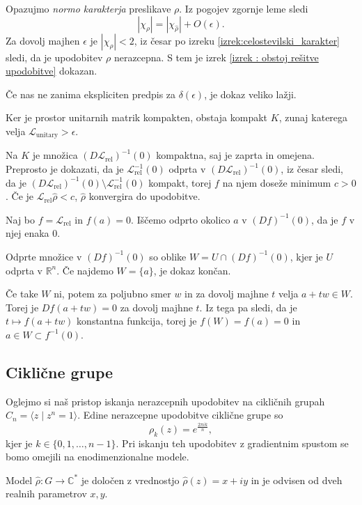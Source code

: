 \documentclass[mat2, tisk]{fmfdelo}
\newcommand{\R}{\mathbb R}
\newcommand{\Loss}[1]{\mathcal L _\text{#1}}
\newcommand{\C}{\mathbb C}
\begin{document}
\begin{dokaz}
  Opazujmo \emph{normo karakterja} preslikave $\rho$. Iz pogojev
  zgornje leme
  sledi
  $$
  |\chi_\rho| = |\chi_{\hat \rho}| + O(\epsilon).
  $$
  Za dovolj majhen $\epsilon$ je
  $|\chi_{ \rho}| < 2$, iz česar po izreku
  \ref{izrek:celostevilski_karakter} sledi, da je upodobitev
  $\rho$ nerazcepna. S tem je izrek
  \ref{izrek : obstoj rešitve upodobitve} dokazan.
\end{dokaz}
\begin{opomba}
  \label{dokaz_kazhdan_enostaven}
  Če nas ne zanima ekspliciten predpis za  $\delta(\epsilon)$,
  je dokaz veliko lažji.

  Ker je prostor unitarnih matrik kompakten, obstaja kompakt
  $K$, zunaj katerega velja
  $\Loss{unitary} > \epsilon$.

  Na $K$ je množica $(D\Loss{rel})^{-1} (0)$ kompaktna,
  saj je zaprta in omejena.
  Preprosto je dokazati, da je
  $ \Loss{rel}^{-1}(0)$ odprta v $(D\Loss{rel})^{-1} (0)$, iz česar sledi, da je
  $(D\Loss{rel})^{-1} (0) \setminus \Loss{rel}^{-1}(0)$ kompakt,
  torej $f$ na njem doseže
  minimum $c > 0$. Če je $\Loss{rel} \hat \rho < c$,
  $\hat \rho$ konvergira do upodobitve.

  Naj bo $f = \Loss{rel}$ in $f(a) = 0$. Iščemo odprto okolico $a$ v
  $(Df)^{-1}(0)$, da je $f$ v njej enaka 0.

  Odprte množice v $(Df)^{-1}(0)$ so oblike $W = U \cap (Df)^{-1}(0)$,
  kjer je $U$ odprta v $\R^n$. Če najdemo $W = \{a\}$, je dokaz končan.

  Če take $W$ ni, potem  za poljubno smer $w$ in  za dovolj majhne $t$ velja
  $a + tw  \in W$. Torej je $Df(a + tw) = 0$ za dovolj majhne $t$.
  Iz tega pa sledi, da je $t \mapsto f(a + tw)$ konstantna funkcija, torej je
  $f(W) = f(a) = 0$ in $a \in W \subset f^{-1}(0)$.
\end{opomba}
\subsection{Ciklične grupe}
\label{subsection:ciklicne-grupe}
Oglejmo si naš pristop iskanja nerazcepnih upodobitev na
cikličnih grupah $C_n = \langle z \mid z^n=1 \rangle$. Edine nerazcepne
upodobitve ciklične grupe so
$$
\rho_k(z) = e^{\frac{2 \pi i k}{n}},
$$
kjer je $k \in \{0, 1, \dotsc, n-1\}$. Pri iskanju teh upodobitev
z gradientnim spustom se bomo omejili na enodimenzionalne modele.

Model $\hat\rho \colon G \to \C^*$ je določen z vrednostjo
$\hat\rho(z) = x + iy$ in je odvisen od dveh realnih parametrov $x, y$.
\end{document}
